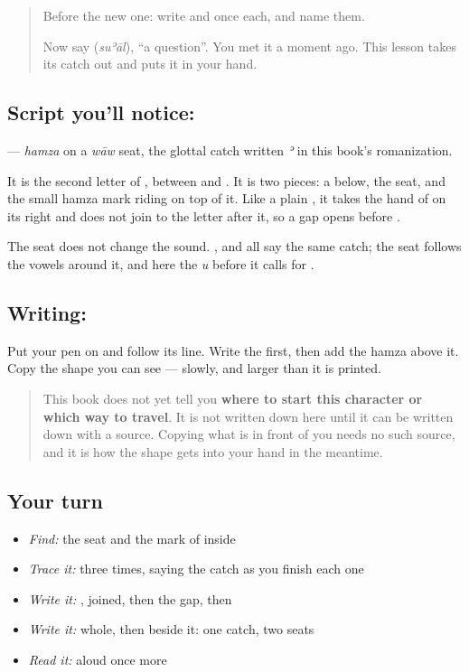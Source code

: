 \label{lesson:AR-W285-hamza-on-waw}



\begin{quote}
Before the new one: write  and  once each, and name them.

Now say \textbf{} (\emph{suʾāl}), \textquotedblleft{}a question\textquotedblright{}. You met it a moment ago. This lesson takes its catch out and puts it in your hand.
\end{quote}

\subsection*{Script you'll notice: }
\textbf{} — \emph{hamza} on a \emph{wāw} seat, the glottal catch written \emph{ʾ} in this book's romanization.

It is the second letter of \textbf{}, between \textbf{} and \textbf{}. It is two pieces: a \textbf{} below, the seat, and the small hamza mark riding on top of it. Like a plain \textbf{}, it takes the hand of \textbf{} on its right and does not join to the letter after it, so a gap opens before \textbf{}.

The seat does not change the sound. \textbf{}, \textbf{} and \textbf{} all say the same catch; the seat follows the vowels around it, and here the \emph{u} before it calls for \textbf{}.

\subsection*{Writing: }
Put your pen on  and follow its line. Write the \textbf{} first, then add the hamza above it. Copy the shape you can see — slowly, and larger than it is printed.

\begin{quote}
This book does not yet tell you \textbf{where to start this character or which way to travel}. It is not written down here until it can be written down with a source. Copying what is in front of you needs no such source, and it is how the shape gets into your hand in the meantime.
\end{quote}

\subsection*{Your turn}
\begin{itemize}
\raggedright
  \item \emph{Find:} the seat and the mark of  inside \textbf{}
  \item \emph{Trace it:}  three times, saying the catch as you finish each one
  \item \emph{Write it:} , joined, then the gap, then 
  \item \emph{Write it:} \textbf{} whole, then \textbf{} beside it: one catch, two seats
  \item \emph{Read it:} \textbf{} aloud once more
\end{itemize}

